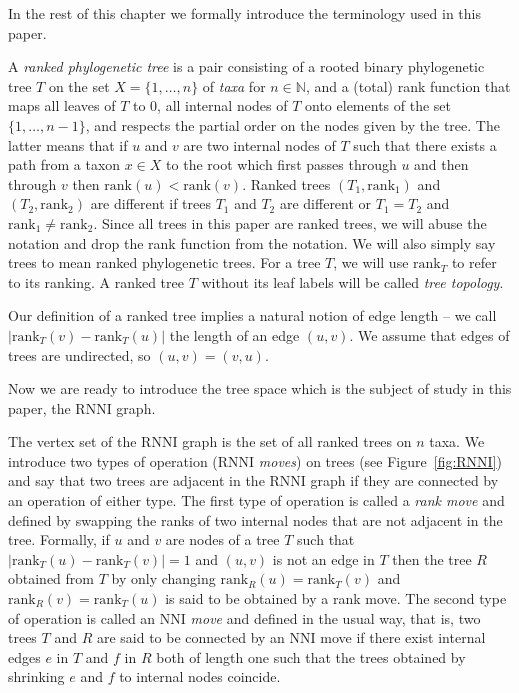 \documentclass{amsart}
\newcommand{\rank}{\mathrm{rank}}
\newcommand{\nni}{\mathrm{NNI}}
\newcommand{\rnni}{\mathrm{RNNI}}
\begin{document}
In the rest of this chapter we formally introduce the terminology used in this paper.

A \emph{ranked phylogenetic tree} is a pair consisting of a rooted binary phylogenetic tree $T$ on the set $X = \{1, \ldots, n\}$ of \emph{taxa} for $n \in \mathbb N$, and a (total) rank function that maps all leaves of $T$ to $0$, all internal nodes of $T$ onto elements of the set $\{1, \ldots, n-1\}$, and respects the partial order on the nodes given by the tree.
The latter means that if $u$ and $v$ are two internal nodes of $T$ such that there exists a path from a taxon $x \in X$ to the root which first passes through $u$ and then through $v$ then $\rank(u) < \rank(v)$.
Ranked trees $(T_1, \rank_1)$ and $(T_2, \rank_2)$ are different if trees $T_1$ and $T_2$ are different or $T_1 = T_2$ and $\rank_1 \neq \rank_2$.
Since all trees in this paper are ranked trees, we will abuse the notation and drop the rank function from the notation.
We will also simply say trees to mean ranked phylogenetic trees.
For a tree $T$, we will use $\rank_T$ to refer to its ranking.
A ranked tree $T$ without its leaf labels will be called \emph{tree topology}.

Our definition of a ranked tree implies a natural notion of edge length -- we call $|\rank_T(v) - \rank_T(u)|$ the length of an edge $(u, v)$.
We assume that edges of trees are undirected, so $(u, v) = (v, u)$.

Now we are ready to introduce the tree space which is the subject of study in this paper, the $\rnni$ graph.

The vertex set of the $\rnni$ graph is the set of all ranked trees on $n$ taxa.
We introduce two types of operation ($\rnni$ \emph{moves}) on trees (see Figure~\ref{fig:RNNI}) and say that two trees are adjacent in the $\rnni$ graph if they are connected by an operation of either type.
The first type of operation is called a \emph{rank move} and defined by swapping the ranks of two internal nodes that are not adjacent in the tree.
Formally, if $u$ and $v$ are nodes of a tree $T$ such that $|\rank_T(u) - \rank_T(v)| = 1$ and $(u, v)$ is not an edge in $T$ then the tree $R$ obtained from $T$ by only changing $\rank_R(u) = \rank_T(v)$ and $\rank_R(v) = \rank_T(u)$ is said to be obtained by a rank move.
The second type of operation is called an $\nni$ \emph{move} and defined in the usual way, that is, two trees $T$ and $R$ are said to be connected by an $\nni$ move if there exist internal edges $e$ in $T$ and $f$ in $R$ both of length one such that the trees obtained by shrinking $e$ and $f$ to internal nodes coincide.
\end{document}
